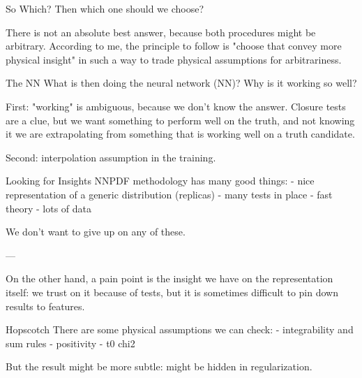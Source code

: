 \documentclass[9pt]{beamer}
\begin{document}
\begin{frame}{So Which?}
    Then which one should we choose?

    There is not an absolute best answer, because both procedures might be arbitrary.
    According to me, the principle to follow is "choose that convey more
    physical insight" in such a way to trade physical assumptions for arbitrariness.
\end{frame}

\begin{frame}{The NN}
    What is then doing the neural network (NN)? Why is it working so well?

    First: "working" is ambiguous, because we don't know the answer. Closure
    tests are a clue, but we want something to perform well on the truth, and
    not knowing it we are extrapolating from something that is working well on
    a truth candidate.

    Second: interpolation assumption in the training.
\end{frame}

\begin{frame}{Looking for Insights}
    NNPDF methodology has many good things:
    - nice representation of a generic distribution (replicas)
    - many tests in place
    - fast theory
    - lots of data

    We don't want to give up on any of these.

    ---

    On the other hand, a pain point is the insight we have on the
    representation itself: we trust on it because of tests, but it is sometimes
    difficult to pin down results to features.

    \begin{exampleblock}{Hopscotch}
        There are some physical assumptions we can check:
        - integrability and sum rules
        - positivity
        - t0 chi2

        But the result might be more subtle: might be hidden in regularization.
    \end{exampleblock}
\end{frame}
\end{document}

